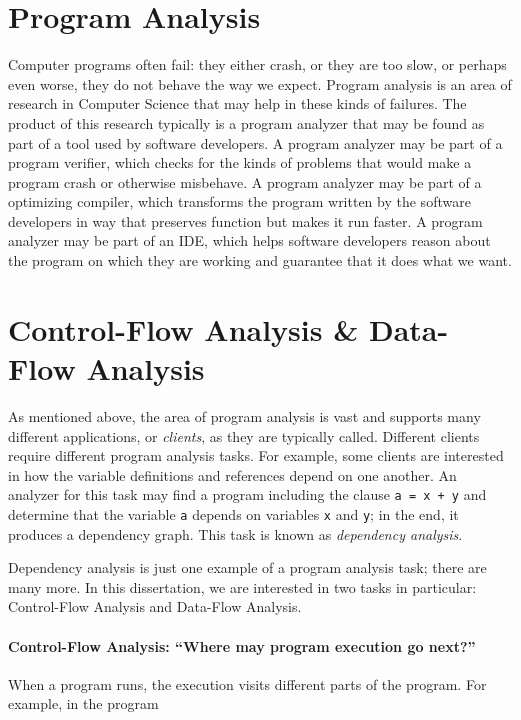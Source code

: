 \documentclass[12pt, oneside]{book}
\begin{document}
\section{Program Analysis}
\label{section:program-analysis}

Computer programs often fail: they either crash, or they are too slow, or perhaps even worse, they do not behave the way we expect. Program analysis is an area of research in Computer Science that may help in these kinds of failures. The product of this research typically is a program analyzer that may be found as part of a tool used by software developers. A program analyzer may be part of a program verifier, which checks for the kinds of problems that would make a program crash or otherwise misbehave. A program analyzer may be part of a optimizing compiler, which transforms the program written by the software developers in way that preserves function but makes it run faster. A program analyzer may be part of an IDE, which helps software developers reason about the program on which they are working and guarantee that it does what we want.

\section{Control-Flow Analysis \& Data-Flow Analysis}

As mentioned above, the area of program analysis is vast and supports many different applications, or \emph{clients}, as they are typically called. Different clients require different program analysis tasks. For example, some clients are interested in how the variable definitions and references depend on one another. An analyzer for this task may find a program including the clause \texttt{a = x + y} and determine that the variable \texttt{a} depends on variables \texttt{x} and \texttt{y}; in the end, it produces a dependency graph. This task is known as \emph{dependency analysis}.

Dependency analysis is just one example of a program analysis task; there are many more. In this dissertation, we are interested in two tasks in particular: Control-Flow Analysis and Data-Flow Analysis.

\paragraph{Control-Flow Analysis: “Where may program execution go next?”}

When a program runs, the execution visits different parts of the program. For example, in the program
\end{document}
